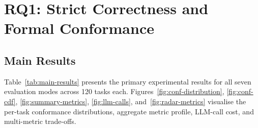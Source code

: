 \section{RQ1: Strict Correctness and Formal Conformance}
\label{sec:exp:rq1}

\subsection{Main Results}

Table~\ref{tab:main-results} presents the primary experimental results for all seven
evaluation modes across 120 tasks each.  Figures~\ref{fig:conf-distribution},
\ref{fig:conf-cdf}, \ref{fig:summary-metrics}, \ref{fig:llm-calls},
and~\ref{fig:radar-metrics} visualise the per-task conformance distributions,
aggregate metric profile, LLM-call cost, and multi-metric trade-offs.

\begin{table}[H]
  \caption{Main comparison results ($n = 120$ tasks per mode). Best formal conformance
    shown in bold. Strict = strict success rate; Conf.\ = formal conformance;
    Kill = mutation kill rate; Fail.\ = mean strict evaluation failures per task
    (out of 64).}
  \label{tab:main-results}
  \centering
\end{table}

